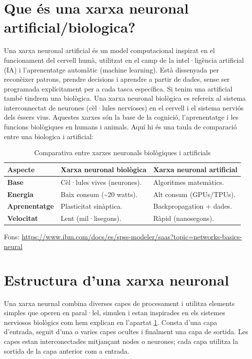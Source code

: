 \section{Que és una xarxa neuronal artificial/biologica?}\label{sec:xarxa neuronal}
Una xarxa neuronal artificial és un model computacional inspirat en el funcionament del cervell humà, utilitzat en el camp de la intel·ligència artificial (IA) i l'aprenentatge automàtic (machine learning). Està dissenyada per reconèixer patrons, prendre decisions i aprendre a partir de dades, sense ser programada explícitament per a cada tasca específica.
Si tenim una artificial també tindrem una biològica. Una xarxa neuronal biològica es refereix al sistema interconnectat de neurones (cèl·lules nervioses) en el cervell i el sistema nerviós dels éssers vius. Aquestes xarxes són la base de la cognició, l'aprenentatge i les funcions biològiques en humans i animals.
Aquí hi és una taula de comparació entre una biologica i artificial:

\begin{table}[h!]
\begin{tabular}{|l|l|l|}
\hline
\textbf{Aspecte} & \textbf{Xarxa neuronal biològica} & \textbf{Xarxa neuronal artificial} \\ \hline
\textbf{Base} & Cèl·lules vives (neurones). & Algoritmes matemàtics. \\ \hline
\textbf{Energia} & Baix consum (\textasciitilde20 watts). & Alt consum (GPUs/TPUs). \\ \hline
\textbf{Aprenentatge} & Plasticitat sinàptica. & Backpropagation + dades. \\ \hline
\textbf{Velocitat} & Lent (mil·lisegons). & Ràpid (nanosegons). \\ \hline
\end{tabular}
\caption{Comparativa entre xarxes neuronals biològiques i artificials}
\end{table}
Fons: \href{https://www.ibm.com/docs/es/spss-modeler/saas?topic=networks-basics-neural}{https://www.ibm.com/docs/es/spss-modeler/saas?topic=networks-basics-neural}
\section{Estructura d'una xarxa neuronal}\label{sec:3.6}
Una xarxa neurnal combina diverses capes de procesament i utilitza elements simples que operen en paral·lel, simulen i estan inspirades en els sistemes nerviosos biològics com hem explican en l'apartat \ref{sec:xarxa neuronal}. Consta d'una capa d'entrada, seguit d'una o varies capes ocultes i finalment una capa de sortida. Les capes estan interconectades mitjançant nodes o neurones; cada capa utilitza la sortida de la capa anterior com a entrada.

